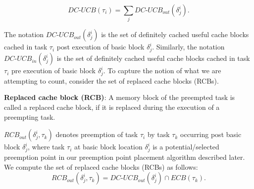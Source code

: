 \begin{equation}\label{eqn:dcucb-task}
    \textit{DC-UCB}(\tau_{i}) = \sum_{j} \textit{DC-UCB}_{out}(\delta_{j}^{i}).
\end{equation}

\noindent The notation
\begin{math}\textit{DC-UCB}_{out}(\delta_{j}^{i})\end{math} is the set of definitely cached useful cache blocks cached in task \begin{math}\tau_{i}\end{math} post execution of basic block \begin{math}\delta_{j}^{i}\end{math}.  Similarly, the notation \begin{math}\textit{DC-UCB}_{in}(\delta_{j}^{i})\end{math} is the set of definitely cached useful cache blocks cached in task \begin{math}\tau_{i}\end{math} pre execution of basic block \begin{math}\delta_{j}^{i}\end{math}. To capture the notion of what we are attempting to count, consider the set of replaced cache blocks (RCBs).

\begin{definition}
\textbf{Replaced cache block (RCB)}: A memory block of the preempted task is called a replaced cache block, if it is replaced during the execution of a preempting task.
\end{definition}

\noindent \begin{math}\textit{RCB}_{out}(\delta_{j}^{i},\tau_{k})\end{math} denotes preemption of task \begin{math}\tau_{i}\end{math} by task \begin{math}\tau_{k}\end{math} occurring post basic block \begin{math}\delta_{j}^{i}\end{math}, where task \begin{math}\tau_{i}\end{math} at basic block location \begin{math}\delta_{j}^{i}\end{math} is a potential/selected preemption point in our preemption point placement algorithm described later.  We compute the set of replaced cache blocks (RCBs) as follows:
\begin{equation}\label{eqn:rcb-formula}
    \textit{RCB}_{out}(\delta_{j}^{i},\tau_{k}) = \textit{DC-UCB}_{out}(\delta_{j}^{i}) \cap \textit{ECB}(\tau_{k}).
\end{equation}

